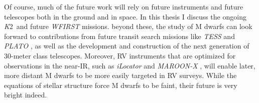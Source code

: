 \documentclass[12pt]{caltech_thesis}
\newcommand{\KT}{{\textit K2}}
\begin{document}
Of course, much of the future work will rely on future instruments and future telescopes
both in the ground and in space. 
In this thesis I discuss the ongoing \KT\ and future \textit{WFIRST} missions.
beyond these, the study of M dwarfs can look forward to contributions from future 
transit search missions like \textit{TESS} \citep{Ricker14} and \textit{PLATO} \citep{Catala10}, as well as the 
development and construction of the next generation of 30-meter class telescopes.
Moreover, RV instruments that are optimized for observations in the near-IR, such as
\textit{iLocator} \citep{Crepp14} and \textit{MAROON-X} \citep{Seifahrt16}, will enable
later, more distant M dwarfs to be more easily targeted in RV surveys.
While the equations of stellar structure force M dwarfs to be faint, their future
is very bright indeed.



\printbibliography[heading=bibintoc]
%





\end{document}
